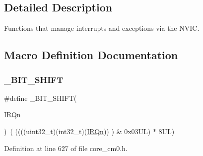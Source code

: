 \subsection{Detailed Description}
Functions that manage interrupts and exceptions via the N\+V\+IC. 



\subsection{Macro Definition Documentation}
\mbox{\label{group___c_m_s_i_s___core___n_v_i_c_functions_ga53c75b28823441c6153269f0ecbed878}} 
\subsubsection{\texorpdfstring{\+\_\+\+B\+I\+T\+\_\+\+S\+H\+I\+FT}{\_BIT\_SHIFT}\hspace{0.1cm}{\footnotesize\ttfamily [1/3]}}
{\footnotesize\ttfamily \#define \+\_\+\+B\+I\+T\+\_\+\+S\+H\+I\+FT(\begin{DoxyParamCaption}\item[{}]{\hyperlink{group___configuration__section__for___c_m_s_i_s_ga666eb0caeb12ec0e281415592ae89083}{I\+R\+Qn} }\end{DoxyParamCaption})~(  ((((uint32\+\_\+t)(int32\+\_\+t)(\hyperlink{group___configuration__section__for___c_m_s_i_s_ga666eb0caeb12ec0e281415592ae89083}{I\+R\+Qn}))         )      \&  0x03\+U\+L) $\ast$ 8\+U\+L)}



Definition at line 627 of file core\+\_\+cm0.\+h.

\mbox{\label{group___c_m_s_i_s___core___n_v_i_c_functions_ga53c75b28823441c6153269f0ecbed878}} 
